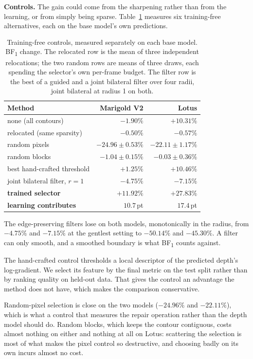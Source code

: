 \documentclass[conference]{IEEEtran}
\newcommand{\bfone}{BF\textsubscript{1}}
\begin{document}
\textbf{Controls.}\label{sec:controls} The gain could come from the sharpening rather than from the learning, or from
simply being sparse. Table~\ref{tab:controls} measures six training-free
alternatives, each on the base model's own predictions.

\begin{table}[t]
\caption{Training-free controls, measured separately on each base model.
\bfone{} change. The relocated row is the mean of three independent
relocations; the two random rows are means of three draws, each spending the
selector's own per-frame budget. The filter row is the best of a guided and a
joint bilateral filter over four radii, joint bilateral at radius 1 on both.}
\label{tab:controls}
\centering
\begin{tabular}{lrr}
\toprule
Method & Marigold V2 & Lotus \\
\midrule
none (all contours)            & $-1.90\%$  & $+10.31\%$ \\
relocated (same sparsity)      & $-0.50\%$  & $-0.57\%$  \\
random pixels                  & $-24.96 \pm 0.53\%$ & $-22.11 \pm 1.17\%$ \\
random blocks                  & $-1.04 \pm 0.15\%$  & $-0.03 \pm 0.36\%$ \\
best hand-crafted threshold    & $+1.25\%$  & $+10.46\%$ \\
\midrule
joint bilateral filter, $r{=}1$ & $-4.75\%$  & $-7.15\%$  \\
\midrule
\textbf{trained selector}      & $\mathbf{+11.92\%}$ & $\mathbf{+27.83\%}$ \\
\textbf{learning contributes}  & $\mathbf{10.7}$\,pt & $\mathbf{17.4}$\,pt \\
\bottomrule
\end{tabular}
\end{table}

The edge-preserving filters lose on both models, monotonically
in the radius, from $-4.75\%$ and $-7.15\%$ at the gentlest setting to
$-50.14\%$ and $-45.30\%$. A filter can only smooth,
and a smoothed boundary is what \bfone{} counts against.

The hand-crafted control thresholds a local descriptor of the predicted depth's
log-gradient. We select its feature by the final metric on the test split rather
than by ranking quality on held-out data. That gives the control an advantage the method does not
have, which makes the comparison conservative.

Random-pixel selection is close on the two models
($-24.96\%$ and $-22.11\%$), which is what a control that measures the repair
operation rather than the depth model should do. Random blocks, which keeps the
contour contiguous, costs almost nothing on either and nothing at all on Lotus:
scattering the selection is most of what makes the pixel control so destructive,
and choosing badly on its own incurs almost no cost.
\end{document}
